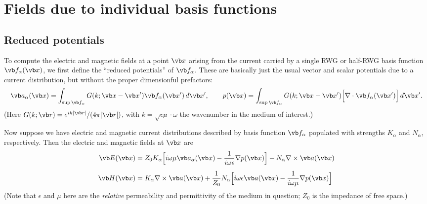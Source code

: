 \newpage
\section{Fields due to individual basis functions}

\subsection*{Reduced potentials}

To compute the electric and magnetic fields at a point $\vb x$ 
arising from the current carried by a single RWG or
half-RWG basis function $\vb f_\alpha(\vb x)$, we first define the
``reduced potentials'' of $\vb f_\alpha$. These are basically just 
the usual vector and scalar potentials due to a current 
distribution, but without the proper dimensionful prefactors:
$$ \vb a_\alpha(\vb x) =
   \int_{\sup \vb f_\alpha} 
     G(k; \vb x - \vb x^\prime) \vb f_\alpha(\vb x^\prime) \, d\vb x^\prime,
   \qquad
   p(\vb x) =
   \int_{\sup \vb f_\alpha} G(k; \vb x - \vb x^\prime) 
                     \Big[\nabla \cdot \vb f_\alpha(\vb x^\prime)\Big] \, d\vb x^\prime.
$$
(Here $G(k; \vb r)=e^{ik|\vb r|}/{(4\pi|\vb r|)}$,
with $k=\sqrt{\epsilon\mu}\cdot \omega$ the wavenumber in the medium 
of interest.)

Now suppose we have electric and magnetic current distributions
described by basis function $\vb f_\alpha$ populated with strengths $K_\alpha$
and $N_\alpha$, respectively. Then the electric and magnetic fields at
$\vb x$ are 
\begin{align*}
 \vb E (\vb x) 
&= 
  Z_0 K_\alpha \Big[ i\omega \mu \vb a_\alpha(\vb x) 
                     - \frac{1}{i\omega \epsilon}\nabla p(\vb x)
               \Big]
 - N_\alpha \nabla \times \vb a(\vb x)
\\[5pt]
 \vb H(\vb x) 
&=
  K_\alpha \nabla \times \vb a(\vb x)
 +\frac{1}{Z_0}
  N_\alpha \Big[   i\omega \epsilon \vb a(\vb x) 
                 - \frac{1}{i\omega \mu }\nabla p(\vb x)
               \Big]
\end{align*}
(Note that $\epsilon$ and $\mu$ here are the \textit{relative}
permeability and permittivity of the medium in question; $Z_0$ 
is the impedance of free space.)

\newpage
